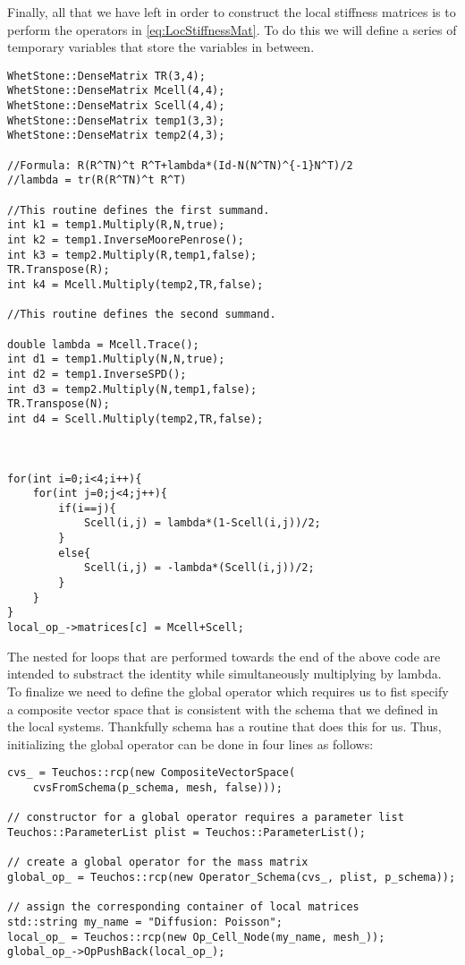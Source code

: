 %
Finally, all that we have left in order to construct the local stiffness matrices is to perform the operators in \eqref{eq:LocStiffnessMat}.
%
To do this we will define a series of temporary variables that store the variables in between.
%
\begin{lstlisting}
WhetStone::DenseMatrix TR(3,4);
WhetStone::DenseMatrix Mcell(4,4);
WhetStone::DenseMatrix Scell(4,4);
WhetStone::DenseMatrix temp1(3,3);
WhetStone::DenseMatrix temp2(4,3);

//Formula: R(R^TN)^t R^T+lambda*(Id-N(N^TN)^{-1}N^T)/2
//lambda = tr(R(R^TN)^t R^T)

//This routine defines the first summand.
int k1 = temp1.Multiply(R,N,true);
int k2 = temp1.InverseMoorePenrose();
int k3 = temp2.Multiply(R,temp1,false);
TR.Transpose(R);
int k4 = Mcell.Multiply(temp2,TR,false);

//This routine defines the second summand.

double lambda = Mcell.Trace();
int d1 = temp1.Multiply(N,N,true);
int d2 = temp1.InverseSPD();
int d3 = temp2.Multiply(N,temp1,false);
TR.Transpose(N);
int d4 = Scell.Multiply(temp2,TR,false);



for(int i=0;i<4;i++){
	for(int j=0;j<4;j++){
		if(i==j){
			Scell(i,j) = lambda*(1-Scell(i,j))/2;
		}
		else{
			Scell(i,j) = -lambda*(Scell(i,j))/2;
		}
	}
}
local_op_->matrices[c] = Mcell+Scell;
\end{lstlisting} 
%
The nested for loops that are performed towards the end of the above code are intended to substract the identity while simultaneously multiplying by lambda.
\\
To finalize we need to define the global operator which requires us to fist specify a composite vector space that is consistent with the schema that we defined in the local systems.
%
Thankfully schema has a routine that does this for us. 
%
Thus, initializing the global operator can be done in four lines as follows:
%
\begin{lstlisting}
cvs_ = Teuchos::rcp(new CompositeVectorSpace(
    cvsFromSchema(p_schema, mesh, false)));

// constructor for a global operator requires a parameter list
Teuchos::ParameterList plist = Teuchos::ParameterList();

// create a global operator for the mass matrix
global_op_ = Teuchos::rcp(new Operator_Schema(cvs_, plist, p_schema));

// assign the corresponding container of local matrices
std::string my_name = "Diffusion: Poisson";
local_op_ = Teuchos::rcp(new Op_Cell_Node(my_name, mesh_));
global_op_->OpPushBack(local_op_);
\end{lstlisting}
%
